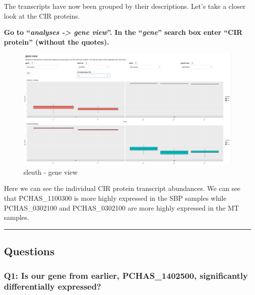 \documentclass[11pt]{article}
\begin{document}
    The transcripts have now been grouped by their descriptions. Let's take
a closer look at the CIR proteins.

\newpage

\textbf{Go to ``\textit{analyses -\textgreater{} gene view}''. In the
``\textit{gene}'' search box enter ``CIR protein'' (without the quotes).}

    \begin{figure}[!h]
\centering
\includegraphics{images/sleuth-gene-view.png}
\caption{sleuth - gene view}
\end{figure}

    Here we can see the individual CIR protein transcript abundances. We can
see that PCHAS\_1100300 is more highly expressed in the SBP samples
while PCHAS\_0302100 and PCHAS\_0302100 are more highly expressed in the
MT samples.

    \begin{center}\rule{0.5\linewidth}{0.5pt}\end{center}

    \hypertarget{questions}{%
\subsection{Questions}\label{questions}}

\hypertarget{q1-is-our-gene-from-earlier-pchas_1402500-significantly-differentially-expressed}{%
\subsubsection{Q1: Is our gene from earlier, PCHAS\_1402500,
significantly differentially
expressed?}\label{q1-is-our-gene-from-earlier-pchas_1402500-significantly-differentially-expressed}}


\end{document}
